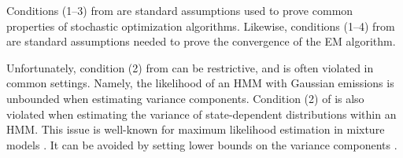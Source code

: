 


Conditions (1--3) from \citet{Johnson:2013} are standard assumptions used to prove common properties of stochastic optimization algorithms. Likewise, conditions (1--4) from \citet{Wu:1983} are standard assumptions needed to prove the convergence of the EM algorithm. 

Unfortunately, condition (2) from \citet{Wu:1983} can be restrictive, and is often violated in common settings. Namely, the likelihood of an HMM with Gaussian emissions is unbounded when estimating variance components. Condition (2) of \citet{Johnson:2013} is also violated when estimating the variance of state-dependent distributions within an HMM. This issue is well-known for maximum likelihood estimation in mixture models \citep{Chen:2009,Liu:2015b}. It can be avoided by setting lower bounds on the variance components \citep{Zucchini:2016}. %


